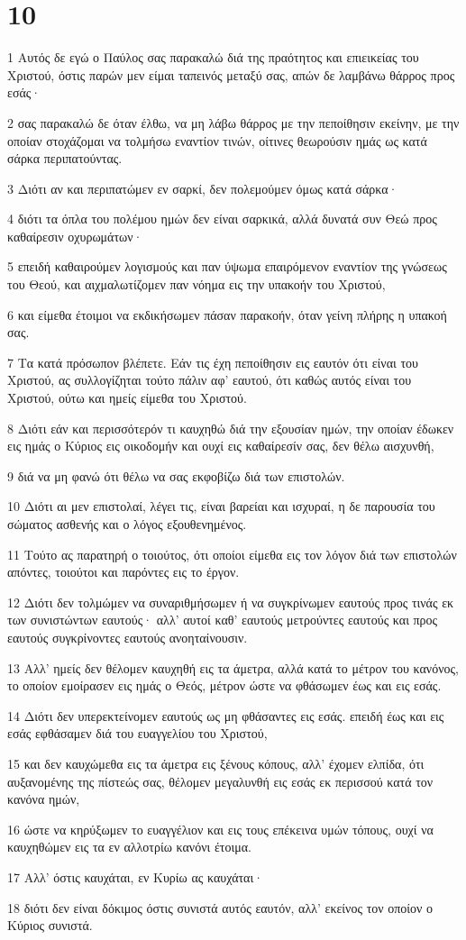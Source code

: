 \chapter{10}

\par 1 Αυτός δε εγώ ο Παύλος σας παρακαλώ διά της πραότητος και επιεικείας του Χριστού, όστις παρών μεν είμαι ταπεινός μεταξύ σας, απών δε λαμβάνω θάρρος προς εσάς·
\par 2 σας παρακαλώ δε όταν έλθω, να μη λάβω θάρρος με την πεποίθησιν εκείνην, με την οποίαν στοχάζομαι να τολμήσω εναντίον τινών, οίτινες θεωρούσιν ημάς ως κατά σάρκα περιπατούντας.
\par 3 Διότι αν και περιπατώμεν εν σαρκί, δεν πολεμούμεν όμως κατά σάρκα·
\par 4 διότι τα όπλα του πολέμου ημών δεν είναι σαρκικά, αλλά δυνατά συν Θεώ προς καθαίρεσιν οχυρωμάτων·
\par 5 επειδή καθαιρούμεν λογισμούς και παν ύψωμα επαιρόμενον εναντίον της γνώσεως του Θεού, και αιχμαλωτίζομεν παν νόημα εις την υπακοήν του Χριστού,
\par 6 και είμεθα έτοιμοι να εκδικήσωμεν πάσαν παρακοήν, όταν γείνη πλήρης η υπακοή σας.
\par 7 Τα κατά πρόσωπον βλέπετε. Εάν τις έχη πεποίθησιν εις εαυτόν ότι είναι του Χριστού, ας συλλογίζηται τούτο πάλιν αφ' εαυτού, ότι καθώς αυτός είναι του Χριστού, ούτω και ημείς είμεθα του Χριστού.
\par 8 Διότι εάν και περισσότερόν τι καυχηθώ διά την εξουσίαν ημών, την οποίαν έδωκεν εις ημάς ο Κύριος εις οικοδομήν και ουχί εις καθαίρεσίν σας, δεν θέλω αισχυνθή,
\par 9 διά να μη φανώ ότι θέλω να σας εκφοβίζω διά των επιστολών.
\par 10 Διότι αι μεν επιστολαί, λέγει τις, είναι βαρείαι και ισχυραί, η δε παρουσία του σώματος ασθενής και ο λόγος εξουθενημένος.
\par 11 Τούτο ας παρατηρή ο τοιούτος, ότι οποίοι είμεθα εις τον λόγον διά των επιστολών απόντες, τοιούτοι και παρόντες εις το έργον.
\par 12 Διότι δεν τολμώμεν να συναριθμήσωμεν ή να συγκρίνωμεν εαυτούς προς τινάς εκ των συνιστώντων εαυτούς· αλλ' αυτοί καθ' εαυτούς μετρούντες εαυτούς και προς εαυτούς συγκρίνοντες εαυτούς ανοηταίνουσιν.
\par 13 Αλλ' ημείς δεν θέλομεν καυχηθή εις τα άμετρα, αλλά κατά το μέτρον του κανόνος, το οποίον εμοίρασεν εις ημάς ο Θεός, μέτρον ώστε να φθάσωμεν έως και εις εσάς.
\par 14 Διότι δεν υπερεκτείνομεν εαυτούς ως μη φθάσαντες εις εσάς. επειδή έως και εις εσάς εφθάσαμεν διά του ευαγγελίου του Χριστού,
\par 15 και δεν καυχώμεθα εις τα άμετρα εις ξένους κόπους, αλλ' έχομεν ελπίδα, ότι αυξανομένης της πίστεώς σας, θέλομεν μεγαλυνθή εις εσάς εκ περισσού κατά τον κανόνα ημών,
\par 16 ώστε να κηρύξωμεν το ευαγγέλιον και εις τους επέκεινα υμών τόπους, ουχί να καυχηθώμεν εις τα εν αλλοτρίω κανόνι έτοιμα.
\par 17 Αλλ' όστις καυχάται, εν Κυρίω ας καυχάται·
\par 18 διότι δεν είναι δόκιμος όστις συνιστά αυτός εαυτόν, αλλ' εκείνος τον οποίον ο Κύριος συνιστά.

